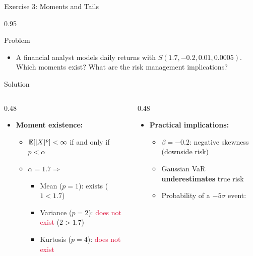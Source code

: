 \documentclass[9pt, aspectratio=169, t]{beamer}
\begin{document}
\begin{frame}{Exercise 3: Moments and Tails}
    \begin{cminipage}{0.95\textwidth}
\begin{block}{Problem}
\begin{itemize}\setlength{\itemsep}{0pt}
    \item A financial analyst models daily returns with $S(1.7, -0.2, 0.01, 0.0005)$. Which moments exist? What are the risk management implications?
\end{itemize}
\end{block}

\begin{exampleblock}{Solution}
\begin{columns}[T]
\begin{column}{0.48\textwidth}
\begin{itemize}\setlength{\itemsep}{0pt}
    \item \textbf{Moment existence:}
    \begin{itemize}\setlength{\itemsep}{0pt}
        \item $\mathbb{E}[|X|^p] < \infty$ if and only if $p < \alpha$
        \item $\alpha = 1.7 \Rightarrow$
        \begin{itemize}\setlength{\itemsep}{0pt}
            \item Mean ($p=1$): \textcolor{Forest}{exists} ($1 < 1.7$)
            \item Variance ($p=2$): \textcolor{Crimson}{does not exist} ($2 > 1.7$)
            \item Kurtosis ($p=4$): \textcolor{Crimson}{does not exist}
        \end{itemize}
    \end{itemize}
\end{itemize}
\end{column}
\begin{column}{0.48\textwidth}
\begin{itemize}\setlength{\itemsep}{0pt}
    \item \textbf{Practical implications:}
    \begin{itemize}\setlength{\itemsep}{0pt}
        \item $\beta = -0.2$: negative skewness (downside risk)
        \item Gaussian VaR \textbf{underestimates} true risk
        \item Probability of a $-5\sigma$ event:
        \begin{itemize}\setlength{\itemsep}{0pt}

\end{itemize}
\end{itemize}
\end{itemize}
\end{column}
\end{columns}
\end{exampleblock}
\end{cminipage}
\end{frame}
\end{document}
